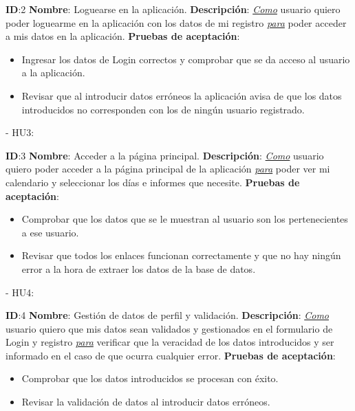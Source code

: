 \documentclass[11pt,openany]{book}
\begin{document}
\textbf{ID}:2 \textbf{Nombre}: Loguearse en la aplicación.\linebreak
\textbf{Descripción}: \textit{\underline{Como}} usuario quiero poder loguearme en la aplicación con los datos de mi registro \textit{\underline{para}} poder acceder a mis datos en la aplicación.\linebreak
\textbf{Pruebas de aceptación}:
\begin{itemize}
\item Ingresar los datos de Login correctos y comprobar que se da acceso al usuario a la aplicación.
\item Revisar que al introducir datos erróneos la aplicación avisa de que los datos introducidos no corresponden con los de ningún usuario registrado.
\end{itemize}
 
- HU3:
 
\textbf{ID}:3 \textbf{Nombre}: Acceder a la página principal.\linebreak
\textbf{Descripción}: \textit{\underline{Como}} usuario quiero poder acceder a la página principal de la aplicación \textit{\underline{para}} poder ver mi calendario y seleccionar los días e informes que necesite.\linebreak
\textbf{Pruebas de aceptación}:
\begin{itemize}
\item Comprobar que los datos que se le muestran al usuario son los pertenecientes a ese usuario.
\item Revisar que todos los enlaces funcionan correctamente y que no hay ningún error a la hora de extraer los datos de la base de datos.
\end{itemize}
 
- HU4:
 
\textbf{ID}:4 \textbf{Nombre}: Gestión de datos de perfil y validación.\linebreak
\textbf{Descripción}: \textit{\underline{Como}} usuario quiero que mis datos sean validados y gestionados en el formulario de Login y registro \textit{\underline{para}} verificar que la veracidad de los datos introducidos y ser informado en el caso de que ocurra cualquier error.\linebreak
\textbf{Pruebas de aceptación}:
\begin{itemize}
\item Comprobar que los datos introducidos se procesan con éxito.
\item Revisar la validación de datos al introducir datos erróneos.
\end{itemize}
 
\end{document}
